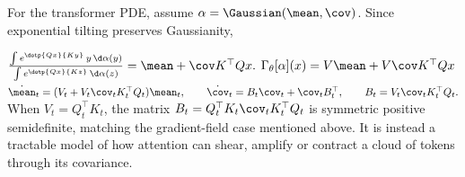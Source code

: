 \begin{example}
For the transformer PDE, assume $\alpha=\Gaussian(\mean,\cov)$. Since exponential tilting preserves Gaussianity,

\(\frac{\int e^{\dotp{Qx}{Ky}}\,y\,\d\alpha(y)} {\int e^{\dotp{Qx}{Kz}}\,\d\alpha(z)} = \mean+\cov K^\top Qx.\)
\(\Gamma_\theta[\alpha](x)=V\mean+V\cov K^\top Qx\)
\(\dot\mean_t=(V_t+V_t\cov_tK_t^\top Q_t)\mean_t, \qquad \dot\cov_t=B_t\cov_t+\cov_tB_t^\top, \qquad B_t=V_t\cov_tK_t^\top Q_t.\)
When $V_t=Q_t^\top K_t$, the matrix $B_t=Q_t^\top K_t\cov_tK_t^\top Q_t$ is symmetric positive semidefinite, matching the gradient-field case mentioned above. It is instead a tractable model of how attention can shear, amplify or contract a cloud of tokens through its covariance.

\end{example}